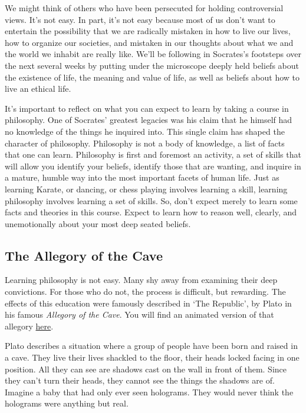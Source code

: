 \documentclass[]{article}
\begin{document}
We might think of others who have been persecuted for holding
controversial views. It's not easy. In part, it's not easy because most
of us don't want to entertain the possibility that we are radically
mistaken in how to live our lives, how to organize our societies, and
mistaken in our thoughts about what we and the world we inhabit are
really like. We'll be following in Socrates's footsteps over the next
several weeks by putting under the microscope deeply held beliefs about
the existence of life, the meaning and value of life, as well as beliefs
about how to live an ethical life.

It's important to reflect on what you can expect to learn by taking a
course in philosophy. One of Socrates' greatest legacies was his claim
that he himself had no knowledge of the things he inquired into. This
single claim has shaped the character of philosophy. Philosophy is not a
body of knowledge, a list of facts that one can learn. Philosophy is
first and foremost an activity, a set of skills that will allow you
identify your beliefs, identify those that are wanting, and inquire in a
mature, humble way into the most important facets of human life. Just as
learning Karate, or dancing, or chess playing involves learning a skill,
learning philosophy involves learning a set of skills. So, don't expect
merely to learn some facts and theories in this course. Expect to learn
how to reason well, clearly, and unemotionally about your most deep
seated beliefs.

\subsection{The Allegory of the Cave}\label{the-allegory-of-the-cave}

Learning philosophy is not easy. Many shy away from examining their deep
convictions. For those who do not, the process is difficult, but
rewarding. The effects of this education were famously described in `The
Republic', by Plato in his famous \emph{Allegory of the Cave}. You will
find an animated version of that allegory
\href{https://www.youtube.com/watch?v=h55X9LJTAg4}{here}.

Plato describes a situation where a group of people have been born and
raised in a cave. They live their lives shackled to the floor, their
heads locked facing in one position. All they can see are shadows cast
on the wall in front of them. Since they can't turn their heads, they
cannot see the things the shadows are of. Imagine a baby that had only
ever seen holograms. They would never think the holograms were anything
but real.
\end{document}
